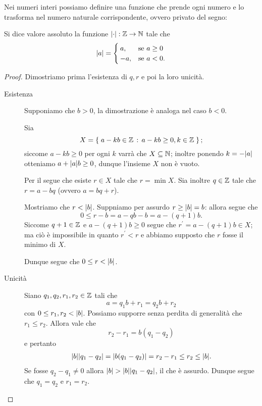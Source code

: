 Nei numeri interi possiamo definire una funzione che prende ogni numero e lo trasforma nel numero naturale corrispondente, ovvero privato del segno:
\begin{definition}
    Si dice valore assoluto la funzione $\abs*{\cdot} : \Z \to \N$ tale che \[
        \abs*{a} = \begin{cases}
            a, &\text{se } a \geq 0\\
            -a, &\text{se } a < 0.
        \end{cases}    
    \]
\end{definition}

\begin{proof}
    Dimostriamo prima l'esistenza di $q, r$ e poi la loro unicità.
    \begin{description}
        \item[Esistenza] Supponiamo che $b > 0$, la dimostrazione è analoga nel caso $b < 0$. 
        
        Sia \[
            X = \set{a - kb \in \Z \suchthat a-kb \geq 0, k \in \Z};
        \] siccome $a-kb \geq 0$ per ogni $k$ varrà che $X \subseteq \N$; inoltre ponendo $k = -\abs*{a}$ otteniamo $a+ \abs*{a}b \geq 0$, dunque l'insieme $X$ non è vuoto.

        Per il  segue che esiste $r \in X$ tale che $r = \min X$. Sia inoltre $q \in \Z$ tale che $r = a - bq$ (ovvero $a = bq + r$).

        Mostriamo che $r < \abs*{b}$. Suppniamo per assurdo $r \geq \abs*{b} = b$: allora segue che \[
            0 \leq r - b = a - qb - b = a - (q+1)b.   
        \] Siccome $q+1 \in \Z$ e $a - (q+1)b \geq 0$ segue che $r^\prime = a-(q+1)b \in X$; ma ciò è impossibile in quanto $r^\prime < r$ e abbiamo supposto che $r$ fosse il minimo di $X$.

        Dunque segue che $0 \leq r < \abs*{b}$.
        \item[Unicità] Siano $q_1, q_2, r_1, r_2 \in \Z$ tali che \[
            a = q_1b + r_1 = q_2b + r_2    
        \] con $0 \leq r_1, r_2 < \abs*{b}$. Possiamo supporre senza perdita di generalità che $r_1 \leq r_2$.
        Allora vale che \[
            r_2 - r_1 = b(q_1 - q_2)  
        \] e pertanto \begin{align*}
            \abs*{b}\abs*{q_1 - q_2} = \abs*{b(q_1 - q_2)} = r_2 - r_1 \leq r_2 \leq \abs*{b}.
        \end{align*} Se fosse $q_2 - q_1 \neq 0$ allora $\abs*{b} > \abs*{b}\abs*{q_1 - q_2}$, il che è assurdo.
        Dunque segue che $q_1 = q_2$ e $r_1 = r_2$. \qedhere
    \end{description}
\end{proof}